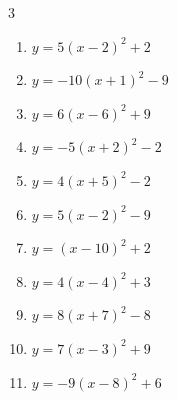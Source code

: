 \begin{multicols}{3}
\begin{enumerate}
        \phantom{$\displaystyle 頂点\left( -9 , -9 \right)$}

  \item $\displaystyle y=5\left( x-2\right)^{2}+2$

        \phantom{$\displaystyle 頂点\left( 2 , 2 \right)$}

  \item $\displaystyle y=-10\left( x+1\right)^{2}-9$

        \phantom{$\displaystyle 頂点\left( -1 , -9 \right)$}

  \item $\displaystyle y=6\left( x-6\right)^{2}+9$

        \phantom{$\displaystyle 頂点\left( 6 , 9 \right)$}

  \item $\displaystyle y=-5\left( x+2\right)^{2}-2$

        \phantom{$\displaystyle 頂点\left( -2 , -2 \right)$}

  \item $\displaystyle y=4\left( x+5\right)^{2}-2$

        \phantom{$\displaystyle 頂点\left( -5 , -2 \right)$}

  \item $\displaystyle y=5\left( x-2\right)^{2}-9$

        \phantom{$\displaystyle 頂点\left( 2 , -9 \right)$}

  \item $\displaystyle y=\left( x-10\right)^{2}+2$

        \phantom{$\displaystyle 頂点\left( 10 , 2 \right)$}

  \item $\displaystyle y=4\left( x-4\right)^{2}+3$

        \phantom{$\displaystyle 頂点\left( 4 , 3 \right)$}

  \item $\displaystyle y=8\left( x+7\right)^{2}-8$

        \phantom{$\displaystyle 頂点\left( -7 , -8 \right)$}

  \item $\displaystyle y=7\left( x-3\right)^{2}+9$

        \phantom{$\displaystyle 頂点\left( 3 , 9 \right)$}

  \item $\displaystyle y=-9\left( x-8\right)^{2}+6$

        \phantom{$\displaystyle 頂点\left( 8 , 6 \right)$}


\end{enumerate}
\end{multicols}
